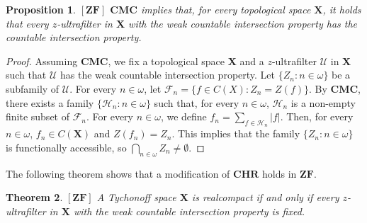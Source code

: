 \documentclass[12pt,twoside,leqno]{article}
\theoremstyle{plain}
\newtheorem{theorem}{Theorem}[section]
\newtheorem{proposition}[theorem]{Proposition}
\theoremstyle{definition}
\theoremstyle{remark}
\begin{document}
\begin{proposition}
	\label{s6:p9}
	$[\mathbf{ZF}]$ $\mathbf{CMC}$ implies that, for every topological space $\mathbf{X}$, it holds that every $z$-ultrafilter in $\mathbf{X}$ with the weak countable intersection property has the countable intersection property.
\end{proposition}

\begin{proof} Assuming $\mathbf{CMC}$, we fix a topological space $\mathbf{X}$ and a $z$-ultrafilter $\mathcal{U}$ in $\mathbf{X}$ such that $\mathcal{U}$ has the weak countable intersection property.  Let $\{Z_n: n\in\omega\}$ be a subfamily of $\mathcal{U}$. For every $n\in\omega$, let $\mathcal{F}_n=\{f\in C(X): Z_n= Z(f)\}$. By $\mathbf{CMC}$, there exists a family $\{\mathcal{H}_n: n\in\omega\}$ such that, for every $n\in\omega$, $\mathcal{H}_n$ is a non-empty finite subset of $\mathcal{F}_n$. For every $n\in\omega$, we define $f_n=\sum\limits_{f\in\mathcal{H}_n}|f|$. Then, for every $n\in\omega$,  $f_n\in C(\mathbf{X})$ and $Z(f_n)=Z_n$. This implies that the family $\{Z_n: n\in\omega\}$ is functionally accessible, so $\bigcap\limits_{n\in\omega}Z_n\neq\emptyset$. 
\end{proof}

The following theorem shows that a modification of $\mathbf{CHR}$ holds in $\mathbf{ZF}$.

\begin{theorem}
	\label{s6:t10}
	$[\mathbf{ZF}]$ A Tychonoff space $\mathbf{X}$ is realcompact if and only if every $z$-ultrafilter in $\mathbf{X}$ with the weak countable intersection property is fixed. 
\end{theorem}
\end{document}
